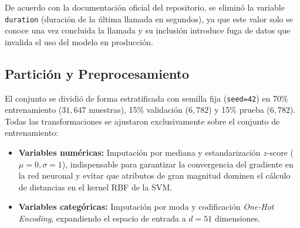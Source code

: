 \documentclass[conference]{IEEEtran}
\begin{document}
De acuerdo con la documentación oficial del repositorio, se eliminó la variable \texttt{duration} (duración de la última llamada en segundos), ya que este valor solo se conoce una vez concluida la llamada y su inclusión introduce fuga de datos que invalida el uso del modelo en producción.

\subsection{Partición y Preprocesamiento}
El conjunto se dividió de forma estratificada con semilla fija (\texttt{seed=42}) en 70\% entrenamiento ($31,647$ muestras), 15\% validación ($6,782$) y 15\% prueba ($6,782$). Todas las transformaciones se ajustaron exclusivamente sobre el conjunto de entrenamiento:
\begin{itemize}
    \item \textbf{Variables numéricas:} Imputación por mediana y estandarización $z$-score ($\mu = 0, \sigma = 1$), indispensable para garantizar la convergencia del gradiente en la red neuronal y evitar que atributos de gran magnitud dominen el cálculo de distancias en el kernel RBF de la SVM.
    \item \textbf{Variables categóricas:} Imputación por moda y codificación \textit{One-Hot Encoding}, expandiendo el espacio de entrada a $d = 51$ dimensiones.
\end{itemize}
\end{document}
